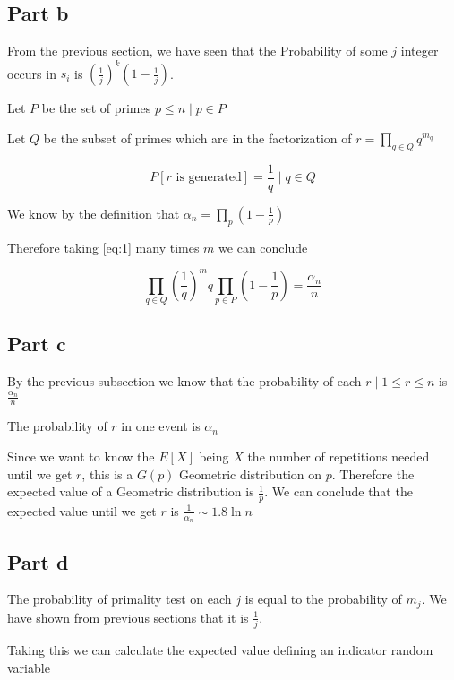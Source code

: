 \documentclass[12pt, a4paper]{article}
\begin{document}
\subsection{Part b}
From the previous section, we have seen that the Probability of some $j$ integer
occurs in $s_i$ is $\left( \frac{1}{j} \right)^k\left( 1 - \frac{1}{j} \right)$.

Let $P$ be the set of primes $p \leq n \mid p \in P$

Let $Q$ be the subset of primes which are in the factorization of $r = \prod_{q
  \in Q} q^{m_q}$

\begin{equation}\label{eq:1}
  P[r \text{ is generated}] = \frac{1}{q} \mid q \in Q
\end{equation}

We know by the definition that $\alpha_n = \prod_p \left( 1 -
  \frac{1}{p}\right)$

Therefore taking \ref{eq:1} many times $m$ we can conclude

\begin{equation}
  \prod_{q \in Q} \left( \frac{1}{q} \right)^mq \prod_{p \in P} \left( 1 - \frac{1}{p} \right) = \frac{\alpha_n}{n}
\end{equation}

\subsection{Part c}
By the previous subsection we know that the probability of each $r \mid 1 \leq r
\leq n$ is $\frac{\alpha_n}{n}$

The probability of $r$ in one event is $\alpha_n$

Since we want to know the $E[X]$ being $X$ the number of repetitions needed
until we get $r$, this is a $G(p)$ Geometric distribution on $p$. Therefore the
expected value of a Geometric distribution is $\frac{1}{p}$. We can conclude
that the expected value until we get $r$ is $\frac{1}{\alpha_n} \sim 1.8\ln n$ 

\subsection{Part d}
The probability of primality test on each $j$ is equal to the probability of
$m_j$. We have shown from previous sections that it is $\frac{1}{j}$.

Taking this we can calculate the expected value defining an indicator random
variable
\end{document}
